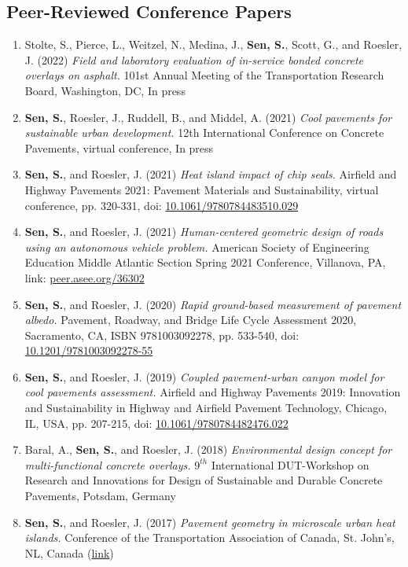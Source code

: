 \documentclass[12pt]{article}
\begin{document}
\subsection*{Peer-Reviewed Conference Papers}
\begin{enumerate}[label=(C\arabic*)]
	\item Stolte, S., Pierce, L., Weitzel, N., Medina, J., \textbf{Sen, S.}, Scott, G., and Roesler, J. (2022) \textit{Field and laboratory evaluation of in-service bonded concrete overlays on asphalt.} 101st Annual Meeting of the Transportation Research Board, Washington, DC, In press
	\item \textbf{Sen, S.}, Roesler, J., Ruddell, B., and Middel, A. (2021) \textit{Cool pavements for sustainable urban development.} 12th International Conference on Concrete Pavements, virtual conference, In press
	\item \textbf{Sen, S.}, and Roesler, J. (2021) \textit{Heat island impact of chip seals.} Airfield and Highway Pavements 2021: Pavement Materials and Sustainability, virtual conference, pp. 320-331, doi: \href{https://doi.org/10.1061/9780784483510.029}{10.1061/9780784483510.029}
	\item \textbf{Sen, S.}, and Roesler, J. (2021) \textit{Human-centered geometric design of roads using an autonomous vehicle problem.} American Society of Engineering Education Middle Atlantic Section Spring 2021 Conference, Villanova, PA, link: \href{https://peer.asee.org/36302}{peer.asee.org/36302}
	\item \textbf{Sen, S.}, and Roesler, J. (2020) \textit{Rapid ground-based measurement of pavement albedo.} Pavement, Roadway, and Bridge Life Cycle Assessment 2020, Sacramento, CA, ISBN 9781003092278, pp. 533-540, doi: \href{https://doi.org/10.1201/9781003092278-55}{10.1201/9781003092278-55}
	\item \textbf{Sen, S.}, and Roesler, J. (2019) \textit{Coupled pavement-urban canyon model for cool pavements assessment.} Airfield and Highway Pavements 2019: Innovation and Sustainability in Highway and Airfield Pavement Technology, Chicago, IL, USA, pp. 207-215, doi: \href{http://dx.doi.org/10.1061/9780784482476.022}{10.1061/9780784482476.022}
	\item Baral, A., \textbf{Sen, S.}, and Roesler, J. (2018) \textit{Environmental design concept for multi-functional concrete overlays.} $9^{th}$ International DUT-Workshop on Research and Innovations for Design of Sustainable and Durable Concrete Pavements, Potsdam, Germany
	\item \textbf{Sen, S.}, and Roesler, J. (2017) \textit{Pavement geometry in microscale urban heat islands.} Conference of the Transportation Association of Canada, St. John’s, NL, Canada (\href{http://www.tac-atc.ca/sites/default/files/conf_papers/sens_-_pavement_geometry_in_microscale_urban_heat_islands.pdf}{link})

\end{enumerate}
\end{document}
